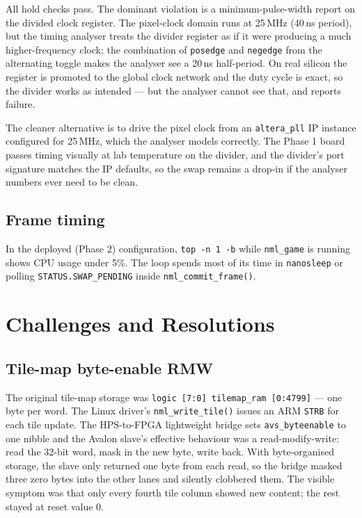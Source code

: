 \documentclass[11pt,letterpaper]{article}
\begin{document}
All hold checks pass. The dominant violation is a minimum-pulse-width report
on the divided clock register. The pixel-clock domain runs at 25\,MHz
(40\,ns period), but the timing analyser treats the divider register as if
it were producing a much higher-frequency clock; the combination of
\texttt{posedge} and \texttt{negedge} from the alternating toggle makes the
analyser see a 20\,ns half-period. On real silicon the register is promoted
to the global clock network and the duty cycle is exact, so the divider
works as intended --- but the analyser cannot see that, and reports failure.

The cleaner alternative is to drive the pixel clock from an
\texttt{altera\_pll} IP instance configured for 25\,MHz, which the analyser
models correctly. The Phase 1 board passes timing visually at lab temperature
on the divider, and the divider's port signature matches the IP defaults, so
the swap remains a drop-in if the analyser numbers ever need to be clean.

\subsection{Frame timing}

In the deployed (Phase 2) configuration, \texttt{top -n 1 -b} while
\texttt{nml\_game} is running shows CPU usage under 5\%. The loop spends most
of its time in \texttt{nanosleep} or polling \texttt{STATUS.SWAP\_PENDING}
inside \texttt{nml\_commit\_frame()}.

\section{Challenges and Resolutions}

\subsection{Tile-map byte-enable RMW}

The original tile-map storage was \texttt{logic [7:0] tilemap\_ram [0:4799]}
--- one byte per word. The Linux driver's \texttt{nml\_write\_tile()} issues
an ARM \texttt{STRB} for each tile update. The HPS-to-FPGA lightweight bridge
sets \texttt{avs\_byteenable} to one nibble and the Avalon slave's effective
behaviour was a read-modify-write: read the 32-bit word, mask in the new
byte, write back. With byte-organised storage, the slave only returned one
byte from each read, so the bridge masked three zero bytes into the other
lanes and silently clobbered them. The visible symptom was that only every
fourth tile column showed new content; the rest stayed at reset value 0.
\end{document}
